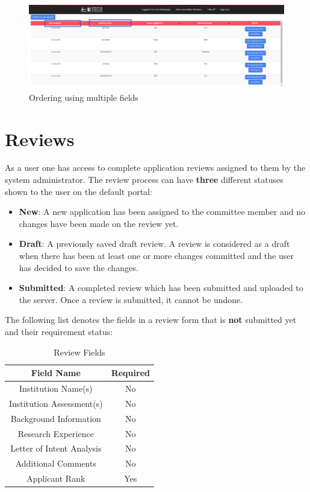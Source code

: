 \documentclass[fontsize=12pt,paper=letter,twoside]{scrartcl}
\begin{document}
\begin{figure}[!htb]
\begin{center}
\includegraphics[width=.9\textwidth]{images/multiple_order.png}
\end{center}
\caption{Ordering using multiple fields}
\label{fig:multiple_order}
\end{figure}

\clearpage
\newpage
\section{Reviews} \label{sec:reviews}
As a user one has access to complete application reviews assigned to them by the system administrator. The review process can have \textbf{three} different statuses shown to the user on the default portal:
\begin{itemize}
\item \textbf{New}: A new application has been assigned to the committee member and no changes have been made on the review yet.
\item \textbf{Draft}: A previously saved draft review. A review is considered as a draft when there has been at least one or more changes committed and the user has decided to save the changes.
\item \textbf{Submitted}: A completed review which has been submitted and uploaded to the server. Once a review is submitted, it cannot be undone.
\end{itemize}

\bigskip
\noindent The following list denotes the fields in a review form that is \textbf{not} submitted yet and their requirement status:
\begin{table}[h]
\centering
\begin{tabular}{|c | c |}
	\cline{1-2}
	\textbf{Field Name} & \textbf{Required}\\ \hline
	Institution Name(s) & No \\ \hline
	Institution Assessment(s) & No \\ \hline
	Background Information & No \\ \hline
	Research Experience & No \\ \hline
	Letter of Intent Analysis & No \\ \hline
	Additional Comments & No \\ \hline
	Applicant Rank & Yes \\ \hline
\end{tabular}
\caption {Review Fields}
\label{tbl:review_fields}
\end{table}
\end{document}
